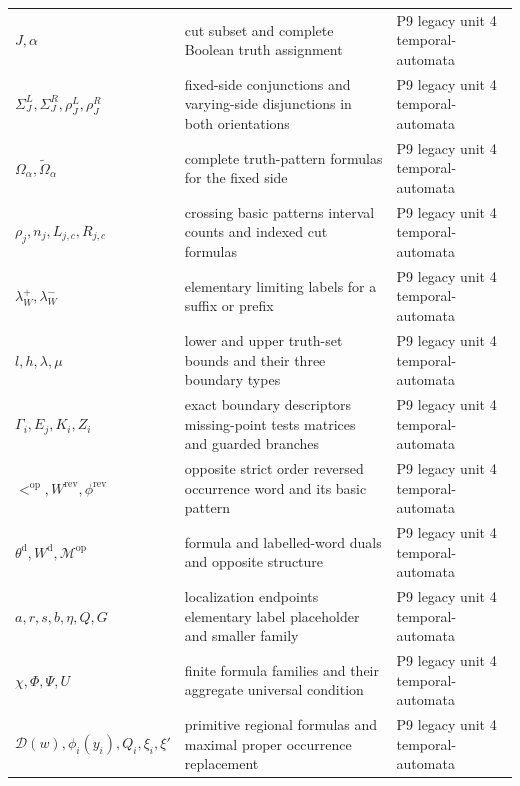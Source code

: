 \begin{longtable}{@{}p{}p{}p{}@{}}
\(J,\allowbreak \alpha\) & cut subset and complete Boolean truth assignment & P9 legacy unit 4 temporal-\allowbreak{}automata \\
\(\Sigma_J^L,\allowbreak \Sigma_J^R,\allowbreak \rho_J^L,\allowbreak \rho_J^R\) & fixed-side conjunctions and varying-side disjunctions in both orientations & P9 legacy unit 4 temporal-\allowbreak{}automata \\
\(\Omega_\alpha,\allowbreak \widetilde\Omega_\alpha\) & complete truth-pattern formulas for the fixed side & P9 legacy unit 4 temporal-\allowbreak{}automata \\
\(\rho_j,\allowbreak n_j,\allowbreak L_{j,c},\allowbreak R_{j,c}\) & crossing basic patterns interval counts and indexed cut formulas & P9 legacy unit 4 temporal-\allowbreak{}automata \\
\(\lambda_W^+,\allowbreak \lambda_W^-\) & elementary limiting labels for a suffix or prefix & P9 legacy unit 4 temporal-\allowbreak{}automata \\
\(l,\allowbreak h,\allowbreak \lambda,\allowbreak \mu\) & lower and upper truth-set bounds and their three boundary types & P9 legacy unit 4 temporal-\allowbreak{}automata \\
\(\Gamma_i,\allowbreak E_j,\allowbreak K_i,\allowbreak Z_i\) & exact boundary descriptors missing-point tests matrices and guarded branches & P9 legacy unit 4 temporal-\allowbreak{}automata \\
\(<^{\mathrm{op}},\allowbreak W^{\mathrm{rev}},\allowbreak \phi^{\mathrm{rev}}\) & opposite strict order reversed occurrence word and its basic pattern & P9 legacy unit 4 temporal-\allowbreak{}automata \\
\(\theta^{\mathrm d},\allowbreak W^{\mathrm d},\allowbreak \mathcal M^{\mathrm{op}}\) & formula and labelled-word duals and opposite structure & P9 legacy unit 4 temporal-\allowbreak{}automata \\
\(a,\allowbreak r,\allowbreak s,\allowbreak b,\allowbreak \eta,\allowbreak Q,\allowbreak G\) & localization endpoints elementary label placeholder and smaller family & P9 legacy unit 4 temporal-\allowbreak{}automata \\
\(\chi,\allowbreak \Phi,\allowbreak \Psi,\allowbreak U\) & finite formula families and their aggregate universal condition & P9 legacy unit 4 temporal-\allowbreak{}automata \\
\(\mathcal D(w),\allowbreak \phi_i(y_i),\allowbreak Q_i,\allowbreak \xi_i,\allowbreak \xi'\) & primitive regional formulas and maximal proper occurrence replacement & P9 legacy unit 4 temporal-\allowbreak{}automata \\

\end{longtable}
